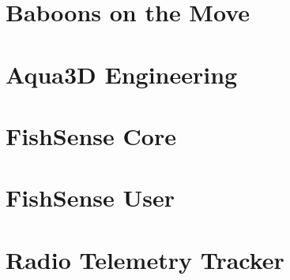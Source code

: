 \section{Baboons on the Move}

\section{Aqua3D Engineering}

\section{FishSense Core}

\section{FishSense User}

\section{Radio Telemetry Tracker}

